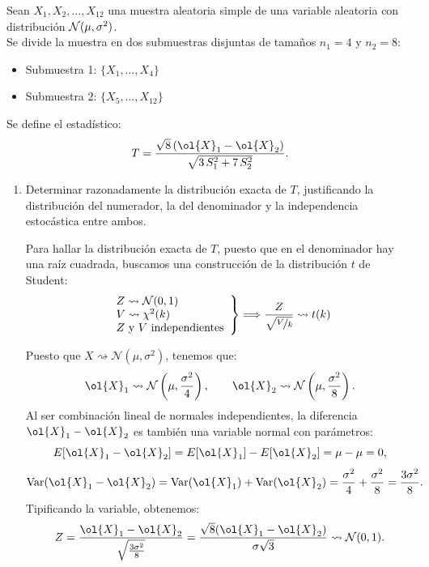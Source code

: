 \begin{ejercicio}
Sean $X_1, X_2, \ldots, X_{12}$ una muestra aleatoria simple de una variable aleatoria con distribución $\mathcal{N}(\mu, \sigma^2)$.\\

Se divide la muestra en dos submuestras disjuntas de tamaños $n_1 = 4$ y $n_2 = 8$:
\begin{itemize}
    \item Submuestra 1: $\{X_1, \ldots, X_4\}$
    \item Submuestra 2: $\{X_5, \ldots, X_{12}\}$
\end{itemize}
Se define el estadístico:
\[
T = \frac{\sqrt{8}\,(\ol{X}_1 - \ol{X}_2)}{\sqrt{3\,S_1^2 + 7\,S_2^2}}.
\]

\begin{enumerate}
    \item Determinar razonadamente la distribución exacta de $T$, justificando la distribución del numerador, la del denominador y la independencia estocástica entre ambos.
    
    Para hallar la distribución exacta de $T$, puesto que en el denominador hay una raíz cuadrada, buscamos una construcción de la distribución $t$ de Student:
    \begin{align*}
        \left.\begin{array}{l}
            Z \rightsquigarrow \mathcal{N}(0,1) \\
            V \rightsquigarrow \chi^2(k) \\
            Z \text{ y } V \text{ independientes}
        \end{array}\right\} \Longrightarrow \frac{Z}{\sqrt{\nicefrac{V}{k}}} \rightsquigarrow t(k)
    \end{align*}

    Puesto que $X\rightsquigarrow \mathcal{N}(\mu, \sigma^2)$, tenemos que:
    \[
        \ol{X}_1 \rightsquigarrow \mathcal{N}\left(\mu, \frac{\sigma^2}{4}\right), \qquad \ol{X}_2 \rightsquigarrow \mathcal{N}\left(\mu, \frac{\sigma^2}{8}\right).
        \]
        Al ser combinación lineal de normales independientes, la diferencia $\ol{X}_1 - \ol{X}_2$ es también una variable normal con parámetros:
        \[
        E[\ol{X}_1 - \ol{X}_2] = E[\ol{X}_1] - E[\ol{X}_2] = \mu - \mu = 0,
        \]
        \[
        \operatorname{Var}(\ol{X}_1 - \ol{X}_2) = \operatorname{Var}(\ol{X}_1) + \operatorname{Var}(\ol{X}_2) = \frac{\sigma^2}{4} + \frac{\sigma^2}{8} = \frac{3\sigma^2}{8}.
        \]
        Tipificando la variable, obtenemos:
        \[
        Z = \frac{\ol{X}_1 - \ol{X}_2}{\sqrt{\frac{3\sigma^2}{8}}} = \frac{\sqrt{8}(\ol{X}_1 - \ol{X}_2)}{\sigma\sqrt{3}} \rightsquigarrow \mathcal{N}(0, 1).
        \]


\end{enumerate}
\end{ejercicio}
